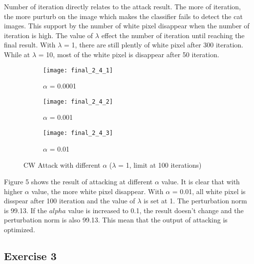\documentclass[11pt]{article}
\begin{document}
Number of iteration directly relates to the attack result. The more of iteration, the more purturb on the image which makes the classifier fails to detect the cat images. This support by the number of white pixel disappear when the number of iteration is high. The value of $\lambda$ effect the number of iteration until reaching the final result. With $\lambda$ = 1, there are still plently of white pixel after 300 iteration. While at $\lambda$ = 10, most of the white pixel is disappear after 50 iteration. 

\begin{figure}[H]
\begin{subfigure}{.3\textwidth}
  \centering
  \texttt{[image: final\_2\_4\_1]}
  \caption{$\alpha$ = 0.0001}
  \label{fig:}
\end{subfigure}
\begin{subfigure}{.3\textwidth}
  \centering
  \texttt{[image: final\_2\_4\_2]}
  \caption{$\alpha$ = 0.001}
  \label{fig:}
\end{subfigure}
\begin{subfigure}{.3\textwidth}
  \centering
  \texttt{[image: final\_2\_4\_3]}
  \caption{$\alpha$ = 0.01}
  \label{fig:}
\end{subfigure}

\caption{CW Attack with different $\alpha$ ($\lambda$ = 1, limit at 100 iterations)}
\label{fig:}
\end{figure}

Figure 5 shows the result of attacking at different $\alpha$ value. It is clear that with higher $\alpha$ value, the more white pixel disappear. With $\alpha$ = 0.01, all white pixel is disspear after 100 iteration and the value of $\lambda$ is set at 1. The perturbation norm is 99.13. If the $alpha$ value is increased to 0.1, the result doesn't change and the perturbation norm is also 99.13. This mean that the output of attacking is optimized.




\subsection*{Exercise 3}
\end{document}
